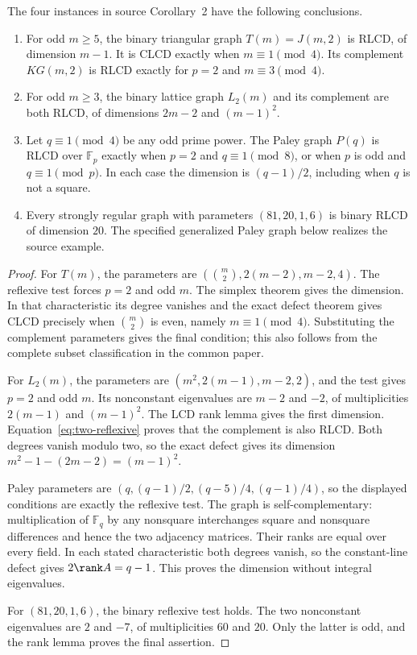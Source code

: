 \begin{proposition}\label{prop:srg-applications}
The four instances in source Corollary~2 have the following conclusions.
\begin{enumerate}
\item For odd $m\geq5$, the binary triangular graph $T(m)=J(m,2)$
is RLCD, of dimension $m-1$. It is CLCD exactly when $m\equiv1\pmod4$.
Its complement $KG(m,2)$ is RLCD exactly for $p=2$ and $m\equiv3\pmod4$.
\item For odd $m\geq3$, the binary lattice graph $L_2(m)$ and its
complement are both RLCD, of dimensions $2m-2$ and $(m-1)^2$.
\item Let $q\equiv1\pmod4$ be any odd prime power. The Paley graph
$P(q)$ is RLCD over $\mathbb F_p$ exactly when $p=2$ and $q\equiv1\pmod8$,
or when $p$ is odd and $q\equiv1\pmod p$. In each case the dimension is
$(q-1)/2$, including when $q$ is not a square.
\item Every strongly regular graph with parameters $(81,20,1,6)$ is
binary RLCD of dimension $20$. The specified generalized Paley graph
below realizes the source example.
\end{enumerate}
\end{proposition}
\begin{proof}
For $T(m)$, the parameters are
$(\binom m2,2(m-2),m-2,4)$. The reflexive test forces $p=2$ and odd $m$.
The simplex theorem gives the dimension. In that characteristic its
degree vanishes and the exact defect theorem gives CLCD precisely when
$\binom m2$ is even, namely $m\equiv1\pmod4$. Substituting the
complement parameters gives the final condition; this also follows
from the complete subset classification in the common paper.

For $L_2(m)$, the parameters are $(m^2,2(m-1),m-2,2)$, and the test gives
$p=2$ and odd $m$. Its nonconstant eigenvalues are $m-2$ and $-2$, of
multiplicities $2(m-1)$ and $(m-1)^2$. The LCD rank lemma gives the first
dimension. Equation~\eqref{eq:two-reflexive} proves that the complement
is also RLCD. Both degrees vanish modulo two, so the exact defect gives
its dimension $m^2-1-(2m-2)=(m-1)^2$.

Paley parameters are $(q,(q-1)/2,(q-5)/4,(q-1)/4)$, so the displayed
conditions are exactly the reflexive test. The graph is self-complementary:
multiplication of $\mathbb F_q$ by any nonsquare interchanges square and
nonsquare differences and hence the two adjacency matrices. Their ranks
are equal over every field. In each stated characteristic both degrees
vanish, so the constant-line defect gives
$2\rank A=q-1$. This proves the dimension without integral eigenvalues.

For $(81,20,1,6)$, the binary reflexive test holds. The two nonconstant
eigenvalues are $2$ and $-7$, of multiplicities $60$ and $20$. Only the
latter is odd, and the rank lemma proves the final assertion.
\end{proof}

